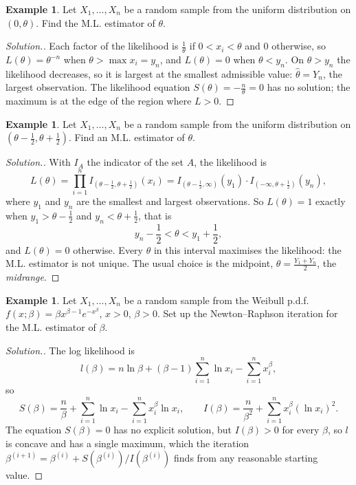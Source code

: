 \documentclass[12pt,a4paper]{report}
\theoremstyle{definition}
\newtheorem{example}[thm]{Example}
\theoremstyle{plain}
\newenvironment{solution}
  {\renewcommand{\qedsymbol}{}\begin{proof}[\textit{Solution}.]}
  {\end{proof}}
\begin{document}
\begin{example}
\label{ex:mleuniformzero}
Let $X_1,\dots,X_n$ be a random sample from the uniform distribution on
$(0,\theta)$. Find the M.L. estimator of $\theta$.
\end{example}

\begin{solution}
Each factor of the likelihood is $\frac1\theta$ if $0<x_i<\theta$ and $0$
otherwise, so $L(\theta) = \theta^{-n}$ when $\theta>\max x_i = y_n$, and
$L(\theta) = 0$ when $\theta<y_n$. On $\theta>y_n$ the likelihood decreases, so it
is largest at the smallest admissible value: $\hat\theta = Y_n$, the largest
observation. The likelihood equation $S(\theta) = -\frac{n}{\theta} = 0$ has no
solution; the maximum is at the edge of the region where $L>0$.
\end{solution}

\begin{example}
\label{ex:mleuniformshift}
Let $X_1,\dots,X_n$ be a random sample from the uniform distribution on
$\left(\theta - \frac{1}{2},\theta + \frac{1}{2}\right)$. Find an M.L. estimator
of $\theta$.
\end{example}

\begin{solution}
With $I_A$ the indicator of the set $A$, the likelihood is
\[L(\theta) = \prod^n_{i=1}I_{\left(\theta - \frac12,\theta +
\frac12\right)}(x_i) = I_{\left(\theta-\frac{1}{2},\infty\right)}(y_1)\cdot
I_{\left(-\infty,\theta + \frac{1}{2}\right)}(y_n),\]
where $y_1$ and $y_n$ are the smallest and largest observations. So $L(\theta) =
1$ exactly when $y_1>\theta - \frac12$ and $y_n<\theta + \frac12$, that is
\[y_n - \frac{1}{2} < \theta < y_1 + \frac{1}{2},\]
and $L(\theta) = 0$ otherwise. Every $\theta$ in this interval maximises the
likelihood: the M.L. estimator is not unique. The usual choice is the midpoint,
$\hat{\theta} = \frac{Y_1 + Y_n}{2}$, the \emph{midrange}.
\end{solution}

\begin{example}
\label{ex:mleweibull}
Let $X_1, \dots, X_n$ be a random sample from the Weibull p.d.f.
$f(x;\beta) = \beta x^{\beta - 1} e^{-x^{\beta}}$, $x > 0$, $\beta > 0$. Set up the
Newton--Raphson iteration for the M.L. estimator of $\beta$.
\end{example}

\begin{solution}
The log likelihood is
\[l(\beta) = n\ln \beta + (\beta - 1)\sum^n_{i = 1}\ln x_i - \sum^n_{i =
1}x_i^{\beta} ,\]
so
\[S(\beta) = \frac{n}{\beta}+ \sum^n_{i = 1}\ln x_i - \sum^n_{i = 1} x_i^{\beta}
\ln x_i ,\qquad I(\beta) = \frac{n}{\beta^2} + \sum^n_{i = 1} x_i^{\beta}(\ln
x_i)^2 .\]
The equation $S(\beta) = 0$ has no explicit solution, but $I(\beta)>0$ for every
$\beta$, so $l$ is concave and has a single maximum, which the iteration
$\beta^{(i + 1)} = \beta^{(i)} + S\left(\beta^{(i)}\right)/I\left(\beta^{(i)}\right)$
finds from any reasonable starting value.
\end{solution}
\end{document}
